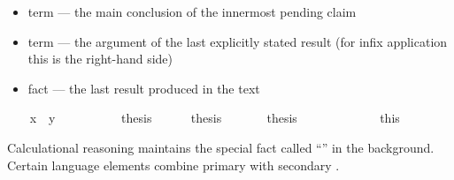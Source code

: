 \begin{isabellebody}
\begin{isamarkuptext}
\begin{itemize}
  \item term  --- the main conclusion of the
  innermost pending claim

  \item term  --- the argument of the last explicitly
    stated result (for infix application this is the right-hand side)

  \item fact  --- the last result produced in the text

  \end{itemize}%
\end{isamarkuptext}%
\isamarkuptrue%
\isamarkupfalse%
\isanewline
{}\isanewline
%
\isadelimproof
\ \ %
\endisadelimproof
%
\isatagproof
{}\isamarkupfalse%
\ {}x\ {}\ y{}\isanewline
\ \ \isamarkupfalse%
\ {}%
\endisatagproof
{\isafoldproof}%
%
\isadelimproof
\isanewline
%
\endisadelimproof
\ \ \ \ \isamarkupfalse%
\ {}thesis\isanewline
%
\isadelimproof
\ \ \ \ %
\endisadelimproof
%
\isatagproof
{}\isamarkupfalse%
\ {}thesis\ \isamarkupfalse%
%
\endisatagproof
{\isafoldproof}%
%
\isadelimproof
\isanewline
%
\endisadelimproof
\ \ \ \ \isamarkupfalse%
\ {}thesis\ \ %
\isanewline
%
\isadelimproof
\ \ %
\endisadelimproof
%
\isatagproof
{}\isamarkupfalse%
%
\endisatagproof
{\isafoldproof}%
%
\isadelimproof
\isanewline
%
\endisadelimproof
\ \ \isamarkupfalse%
\ {}{}{}\isanewline
\ \ \isamarkupfalse%
\ this\isanewline
{}\isamarkupfalse%
%
\begin{isamarkuptext}%
Calculational reasoning maintains the special fact called
  ``'' in the background.  Certain language
  elements combine primary  with secondary .%
\end{isamarkuptext}%

\end{isabellebody}
